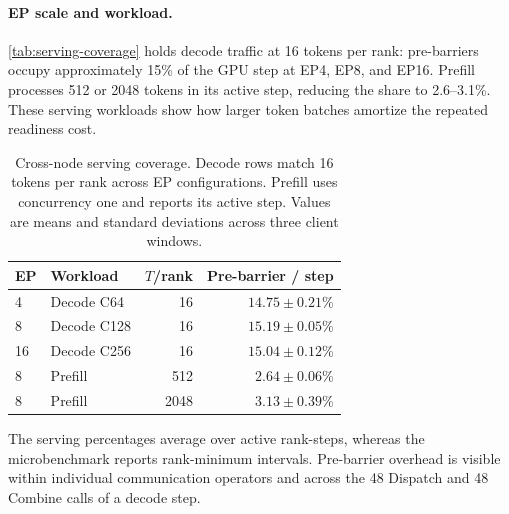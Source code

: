 \paragraph{EP scale and workload.}
\autoref{tab:serving-coverage} holds decode traffic at 16 tokens per rank: pre-barriers occupy approximately 15\% of the GPU step at EP4, EP8, and EP16. Prefill processes 512 or 2048 tokens in its active step, reducing the share to 2.6--3.1\%. These serving workloads show how larger token batches amortize the repeated readiness cost.

\begin{table}[t]
\centering
\small
\setlength{\tabcolsep}{4pt}
\begin{tabular}{@{}llrr@{}}
\toprule
EP & Workload & $T$/rank & Pre-barrier / step\\
\midrule
4  & Decode C64  & 16   & $14.75\pm0.21$\%\\
8  & Decode C128 & 16   & $15.19\pm0.05$\%\\
16 & Decode C256 & 16   & $15.04\pm0.12$\%\\
8  & Prefill     & 512  & $2.64\pm0.06$\%\\
8  & Prefill     & 2048 & $3.13\pm0.39$\%\\
\bottomrule
\end{tabular}
\caption{Cross-node serving coverage. Decode rows match 16 tokens per rank across EP configurations. Prefill uses concurrency one and reports its active step. Values are means and standard deviations across three client windows.}
\label{tab:serving-coverage}
\end{table}

The serving percentages average over active rank-steps, whereas the microbenchmark reports rank-minimum intervals. Pre-barrier overhead is visible within individual communication operators and across the 48 Dispatch and 48 Combine calls of a decode step.
